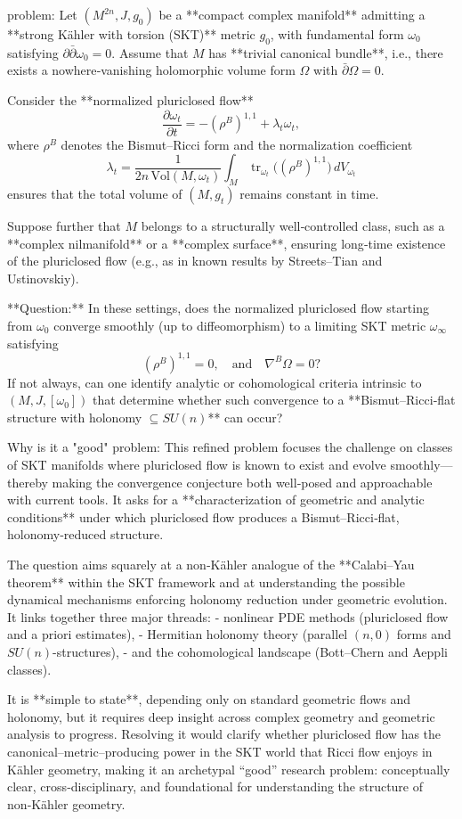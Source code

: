 problem:  
Let \( (M^{2n}, J, g_0) \) be a **compact complex manifold** admitting a **strong Kähler with torsion (SKT)** metric \( g_0 \), with fundamental form \( \omega_0 \) satisfying \( \partial\bar{\partial}\omega_0=0 \).  
Assume that \( M \) has **trivial canonical bundle**, i.e., there exists a nowhere‑vanishing holomorphic volume form \( \Omega \) with \( \bar{\partial}\Omega=0 \).

Consider the **normalized pluriclosed flow**  
\[
\frac{\partial \omega_t}{\partial t} = -(\rho^B)^{1,1} + \lambda_t \omega_t,
\]
where \( \rho^B \) denotes the Bismut–Ricci form and the normalization coefficient  
\[
\lambda_t = \frac{1}{2n\,\mathrm{Vol}(M,\omega_t)}\int_M \operatorname{tr}_{\omega_t}\big((\rho^B)^{1,1}\big)\,dV_{\omega_t}
\]
ensures that the total volume of \( (M, g_t) \) remains constant in time.  

Suppose further that \( M \) belongs to a structurally well‑controlled class, such as a **complex nilmanifold** or a **complex surface**, ensuring long‑time existence of the pluriclosed flow (e.g., as in known results by Streets–Tian and Ustinovskiy).  

**Question:**  
In these settings, does the normalized pluriclosed flow starting from \( \omega_0 \) converge smoothly (up to diffeomorphism) to a limiting SKT metric \( \omega_\infty \) satisfying  
\[
(\rho^B)^{1,1}=0, \quad \text{and}\quad \nabla^B\Omega=0?
\]
If not always, can one identify analytic or cohomological criteria intrinsic to \( (M,J,[\omega_0]) \) that determine whether such convergence to a **Bismut–Ricci‑flat structure with holonomy \(\subseteq SU(n)\)** can occur?

Why is it a "good" problem:  
This refined problem focuses the challenge on classes of SKT manifolds where pluriclosed flow is known to exist and evolve smoothly—thereby making the convergence conjecture both well‑posed and approachable with current tools. It asks for a **characterization of geometric and analytic conditions** under which pluriclosed flow produces a Bismut–Ricci‑flat, holonomy‑reduced structure.  

The question aims squarely at a non‑Kähler analogue of the **Calabi–Yau theorem** within the SKT framework and at understanding the possible dynamical mechanisms enforcing holonomy reduction under geometric evolution. It links together three major threads:
- nonlinear PDE methods (pluriclosed flow and a priori estimates),
- Hermitian holonomy theory (parallel \((n,0)\) forms and \(SU(n)\)-structures),
- and the cohomological landscape (Bott–Chern and Aeppli classes).

It is **simple to state**, depending only on standard geometric flows and holonomy, but it requires deep insight across complex geometry and geometric analysis to progress. Resolving it would clarify whether pluriclosed flow has the canonical–metric–producing power in the SKT world that Ricci flow enjoys in Kähler geometry, making it an archetypal “good” research problem: conceptually clear, cross‑disciplinary, and foundational for understanding the structure of non‑Kähler geometry.